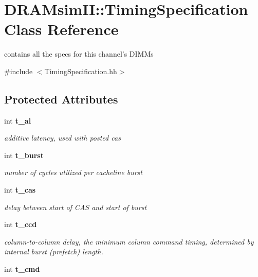 \section{DRAMsimII::TimingSpecification Class Reference}
\label{class_d_r_a_msim_i_i_1_1_timing_specification}


contains all the specs for this channel's DIMMs  




{\ttfamily \#include $<$TimingSpecification.hh$>$}

\subsection*{Protected Attributes}
\begin{DoxyCompactItemize}
\item 
int {\bf t\_\-al}\label{class_d_r_a_msim_i_i_1_1_timing_specification_af24fead42f8f704de507e20015049343}

\begin{DoxyCompactList}\small\item\em additive latency, used with posted cas \item\end{DoxyCompactList}\item 
int {\bf t\_\-burst}\label{class_d_r_a_msim_i_i_1_1_timing_specification_aca29997bd86855187f0335282f9f030d}

\begin{DoxyCompactList}\small\item\em number of cycles utilized per cacheline burst \item\end{DoxyCompactList}\item 
int {\bf t\_\-cas}\label{class_d_r_a_msim_i_i_1_1_timing_specification_a86c477983b5afa89eef0b51b7ff4dec5}

\begin{DoxyCompactList}\small\item\em delay between start of CAS and start of burst \item\end{DoxyCompactList}\item 
int {\bf t\_\-ccd}\label{class_d_r_a_msim_i_i_1_1_timing_specification_a518f0be3ee5548d981d22a6c70f27c7d}

\begin{DoxyCompactList}\small\item\em column-\/to-\/column delay, the minimum column command timing, determined by internal burst (prefetch) length. \item\end{DoxyCompactList}\item 
int {\bf t\_\-cmd}\label{class_d_r_a_msim_i_i_1_1_timing_specification_a4b9b487fe4b01b0eaab793b650beed5a}


\end{DoxyCompactItemize}
